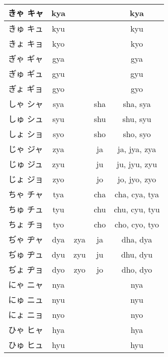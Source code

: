 \documentclass{article}
\begin{document}
\begin{center}
\begin{japanese}
\begin{longtable}{|c|c c c|c|}
                きゃ キャ & kya &&& kya \\ \hline
                きゅ キュ & kyu &&& kyu \\ \hline
                きょ キョ & kyo &&& kyo \\ \hline
                ぎゃ ギャ & gya &&& gya \\ \hline
                ぎゅ ギュ & gyu &&& gyu \\ \hline
                ぎょ ギョ & gyo &&& gyo \\ \hline
                しゃ シャ & sya && \multicolumn{1}{|c|}{sha} & sha, sya \\ \hline
                しゅ シュ & syu && \multicolumn{1}{|c|}{shu} & shu, syu \\ \hline
                しょ ショ & syo && \multicolumn{1}{|c|}{sho} & sho, syo \\ \hline
                じゃ ジャ & zya && \multicolumn{1}{|c|}{ja} & ja, jya, zya \\ \hline
                じゅ ジュ & zyu && \multicolumn{1}{|c|}{ju} & ju, jyu, zyu \\ \hline
                じょ ジョ & zyo && \multicolumn{1}{|c|}{jo} & jo, jyo, zyo \\ \hline
                ちゃ チャ & tya && \multicolumn{1}{|c|}{cha} & cha, cya, tya \\ \hline
                ちゅ チュ & tyu && \multicolumn{1}{|c|}{chu} & chu, cyu, tyu \\ \hline
                ちょ チョ & tyo && \multicolumn{1}{|c|}{cho} & cho, cyo, tyo \\ \hline
                ぢゃ ヂャ & dya & \multicolumn{1}{|c|}{zya} & \multicolumn{1}{|c|}{ja} & dha, dya \\ \hline
                ぢゅ ヂュ & dyu & \multicolumn{1}{|c|}{zyu} & \multicolumn{1}{|c|}{ju} & dhu, dyu \\ \hline
                ぢょ ヂョ & dyo & \multicolumn{1}{|c|}{zyo} & \multicolumn{1}{|c|}{jo} & dho, dyo \\ \hline
                にゃ ニャ & nya &&& nya \\ \hline
                にゅ ニュ & nyu &&& nyu \\ \hline
                にょ ニョ & nyo &&& nyo \\ \hline
                ひゃ ヒャ & hya &&& hya \\ \hline
                ひゅ ヒュ & hyu &&& hyu \\ \hline

\end{longtable}
\end{japanese}
\end{center}
\end{document}
